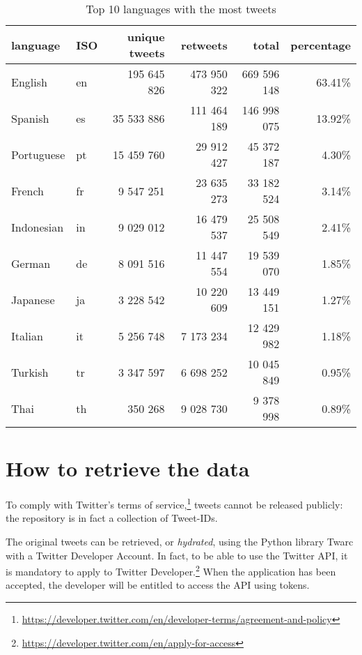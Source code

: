 \begin{table}[H]
    \centering
    \begin{tabularx}{\columnwidth}{@{}XXrrrr@{}}
    		\textbf{language} & \textbf{ISO} & \textbf{unique tweets} & \textbf{retweets} & \textbf{total} & \textbf{percentage} \\
    		\midrule
        English & en & 195 645 826 & 473 950 322 & 669 596 148 & 63.41\% 
        \\
		Spanish & es & 35 533 886 & 111 464 189 & 146 998 075 & 13.92\% 
		\\
		Portuguese & pt & 15 459 760 & 29 912 427 & 45 372 187 & 4.30\% 
		\\
		French & fr & 9 547 251 & 23 635 273 & 33 182 524 & 3.14\% 
		\\
		Indonesian & in & 9 029 012 & 16 479 537 & 25 508 549 & 2.41\%
		\\
		German & de & 8 091 516 & 11 447 554 & 19 539 070 & 1.85\%
		\\
		Japanese & ja & 3 228 542 & 10 220 609 & 13 449 151 & 1.27\%
		\\
		Italian & it & 5 256 748 & 7 173 234 & 12 429 982 & 1.18\%
		\\
		Turkish & tr & 3 347 597 & 6 698 252 & 10 045 849 & 0.95\%
		\\
		Thai & th & 350 268 & 9 028 730 & 9 378 998 & 0.89\%
		\\
		\bottomrule
    \end{tabularx}
    \caption{Top 10 languages with the most tweets}
    \label{tab:dataset-language-stats}
\end{table}

\section{How to retrieve the data}
\label{sec:retrieve-data}

To comply with Twitter's terms of service,\footnote{\url{https://developer.twitter.com/en/developer-terms/agreement-and-policy}} tweets cannot be released publicly: the repository is in fact a collection of Tweet-IDs.

The original tweets can be retrieved, or \textit{hydrated}, using the Python library Twarc with a Twitter Developer Account. In fact, to be able to use the Twitter API, it is mandatory to apply to Twitter Developer.\footnote{\url{https://developer.twitter.com/en/apply-for-access}} When the application has been accepted, the developer will be entitled to access the API using tokens. 

